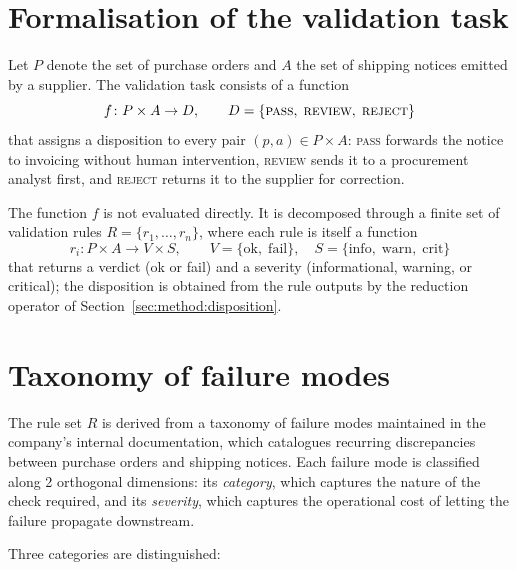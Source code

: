 \section{Formalisation of the validation task}
\label{sec:method:formal}

Let $P$ denote the set of purchase orders and $A$ the set of shipping notices emitted by a supplier. The validation task consists of a function
%
\begin{equation}\label{eq:f}
  f \colon P \times A \to D,
  \qquad
  D = \{\textsc{pass},\; \textsc{review},\; \textsc{reject}\}
\end{equation}
%
that assigns a disposition to every pair $(p, a) \in P \times A$: \textsc{pass} forwards the notice to invoicing without human intervention, \textsc{review} sends it to a procurement analyst first, and \textsc{reject} returns it to the supplier for correction.

The function $f$ is not evaluated directly. It is decomposed through a finite set of validation rules $R = \{r_1, \ldots, r_n\}$, where each rule is itself a function
%
\begin{equation}\label{eq:rule}
  r_i \colon P \times A \to V \times S,
  \qquad
  V = \{\text{ok},\; \text{fail}\},
  \quad
  S = \{\text{info},\; \text{warn},\; \text{crit}\}
\end{equation}
%
that returns a verdict (ok or fail) and a severity (informational, warning, or critical); the disposition is obtained from the rule outputs by the reduction operator of Section~\ref{sec:method:disposition}.


\section{Taxonomy of failure modes}
\label{sec:method:taxonomy}

The rule set $R$ is derived from a taxonomy of failure modes maintained in the company's internal documentation, which catalogues recurring discrepancies between purchase orders and shipping notices. Each failure mode is classified along 2 orthogonal dimensions: its \emph{category}, which captures the nature of the check required, and its \emph{severity}, which captures the operational cost of letting the failure propagate downstream.

Three categories are distinguished:

